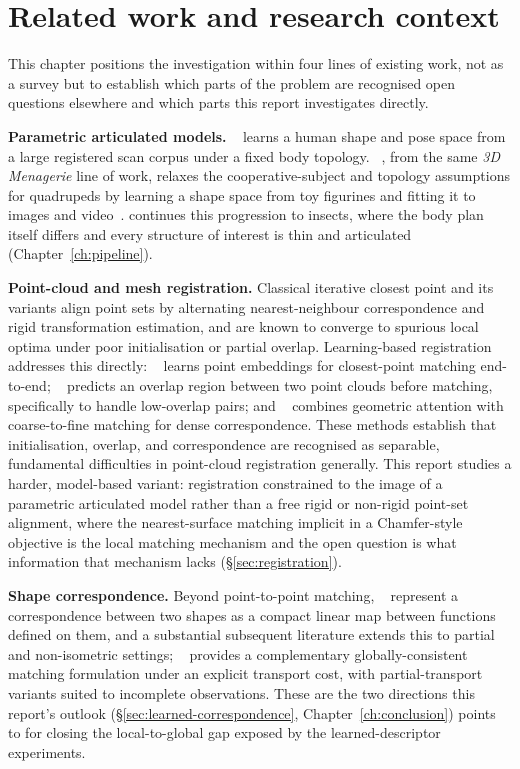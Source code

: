 \chapter{Related work and research context}
\label{ch:related}

This chapter positions the investigation within four lines of existing work,
not as a survey but to establish which parts of the problem are recognised
open questions elsewhere and which parts this report investigates directly.

\textbf{Parametric articulated models.} ~\cite{smpl} learns a
human shape and pose space from a large registered scan corpus under a fixed
body topology. ~\cite{smal}, from the same \emph{3D Menagerie}
line of work, relaxes the cooperative-subject and topology assumptions for
quadrupeds by learning a shape space from toy figurines and fitting it to
images and video~\cite{smalify}.  continues this progression
to insects, where the body plan itself differs and every structure of
interest is thin and articulated (Chapter~\ref{ch:pipeline}).

\textbf{Point-cloud and mesh registration.} Classical iterative closest
point and its variants align point sets by alternating nearest-neighbour
correspondence and rigid transformation estimation, and are known to
converge to spurious local optima under poor initialisation or partial
overlap. Learning-based registration addresses this directly: ~\cite{dcp} learns point embeddings for closest-point
matching end-to-end; ~\cite{predator} predicts an overlap
region between two point clouds before matching, specifically to handle
low-overlap pairs; and ~\cite{geotransformer} combines
geometric attention with coarse-to-fine matching for dense correspondence.
These methods establish that initialisation, overlap, and correspondence
are recognised as separable, fundamental difficulties in point-cloud
registration generally. This report studies a harder, model-based variant:
registration constrained to the image of a parametric articulated model
rather than a free rigid or non-rigid point-set alignment, where the
nearest-surface matching implicit in a Chamfer-style objective is the local
matching mechanism and the open question is what information that mechanism
lacks (\S\ref{sec:registration}).

\textbf{Shape correspondence.} Beyond point-to-point matching,
~\cite{fmaps} represent a correspondence between two
shapes as a compact linear map between functions defined on them, and a
substantial subsequent literature extends this to partial and non-isometric
settings; ~\cite{ot} provides a complementary
globally-consistent matching formulation under an explicit transport cost,
with partial-transport variants suited to incomplete observations. These
are the two directions this report's outlook (\S\ref{sec:learned-correspondence},
Chapter~\ref{ch:conclusion}) points to for closing the local-to-global gap
exposed by the learned-descriptor experiments.

